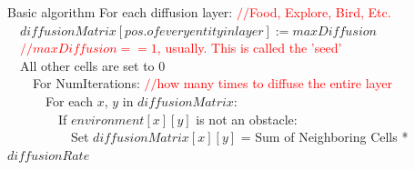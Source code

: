 \documentclass{beamer}
\begin{document}
\begin{frame}{Basic algorithm}
  For each diffusion layer: \textcolor{red}{$//$Food, Explore, Bird, Etc.}\\
  \ \ $diffusionMatrix[pos. of every entity in layer] := maxDiffusion$\\
  \ \ \textcolor{red}{$//maxDiffusion == 1$, usually.  This is called the 'seed'}\\
  \ \ All other cells are set to 0\\
  \ \ \ \ For NumIterations:  \textcolor{red}{$//$how many times to diffuse the entire layer}\\
  \ \ \ \ \ \ For each $x$, $y$ in $diffusionMatrix$:\\
  \ \ \ \ \ \ \ \ If $environment[x][y]$ is not an obstacle:\\
  \ \ \ \ \ \ \ \ \ \ Set $diffusionMatrix[x][y]$ = Sum of Neighboring Cells * $diffusionRate$\\
\end{frame}
\end{document}
